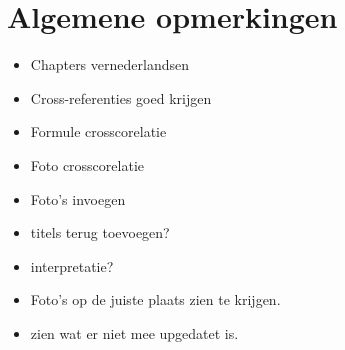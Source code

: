 \documentclass[12pt]{report}
\begin{document}
\section{Algemene opmerkingen}
\begin{itemize}
\item Chapters vernederlandsen
\item Cross-referenties goed krijgen
\item Formule crosscorelatie
\item Foto crosscorelatie
\item Foto's invoegen
\item titels terug toevoegen?
\item interpretatie?
\item Foto's op de juiste plaats zien te krijgen.
\item zien wat er niet mee upgedatet is.

\end{itemize}
\end{document}
